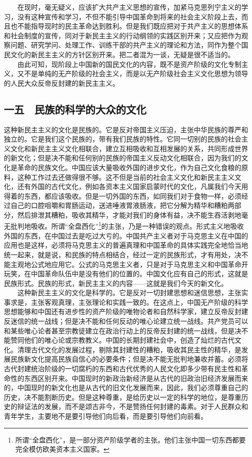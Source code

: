 \documentclass[cn,11pt,chinese]{elegantbook}
\def\myformat#1{\hfil\hfil #1}
\begin{document}
　　在现时，毫无疑义，应该扩大共产主义思想的宣传，加紧马克思列宁主义的学习，没有这种宣传和学习，不但不能引导中国革命到将来的社会主义阶段上去，而且也不能指导现时的民主革命达到胜利。但是我们既应把对于共产主义的思想体系和社会制度的宣传，同对于新民主主义的行动纲领的实践区别开来；又应把作为观察问题、研究学问、处理工作、训练干部的共产主义的理论和方法，同作为整个国民文化的新民主主义的方针区别开来。把二者混为一谈，无疑是很不适当的。\\
　　由此可知，现阶段上中国新的国民文化的内容，既不是资产阶级的文化专制主义，又不是单纯的无产阶级的社会主义，而是以无产阶级社会主义文化思想为领导的人民大众反帝反封建的新民主主义。\\
\subsection*{\myformat{一五　民族的科学的大众的文化}}
这种新民主主义的文化是民族的。它是反对帝国主义压迫，主张中华民族的尊严和独立的。它是我们这个民族的，带有我们民族的特性。它同一切别的民族的社会主义文化和新民主主义文化相联合，建立互相吸收和互相发展的关系，共同形成世界的新文化；但是决不能和任何别的民族的帝国主义反动文化相联合，因为我们的文化是革命的民族文化。中国应该大量吸收外国的进步文化，作为自己文化食粮的原料，这种工作过去还做得很不够。这不但是当前的社会主义文化和新民主主义文化，还有外国的古代文化，例如各资本主义国家启蒙时代的文化，凡属我们今天用得着的东西，都应该吸收。但是一切外国的东西，如同我们对于食物一样，必须经过自己的口腔咀嚼和胃肠运动，送进唾液胃液肠液，把它分解为精华和糟粕两部分，然后排泄其糟粕，吸收其精华，才能对我们的身体有益，决不能生吞活剥地毫无批判地吸收。所谓“全盘西化”\footnote[33]{ 所谓“全盘西化”，是一部分资产阶级学者的主张。他们主张中国一切东西都要完全模仿欧美资本主义国家。}的主张，乃是一种错误的观点。形式主义地吸收外国的东西，在中国过去是吃过大亏的。中国共产主义者对于马克思主义在中国的应用也是这样，必须将马克思主义的普遍真理和中国革命的具体实践完全地恰当地统一起来，就是说，和民族的特点相结合，经过一定的民族形式，才有用处，决不能主观地公式地应用它。公式的马克思主义者，只是对于马克思主义和中国革命开玩笑，在中国革命队伍中是没有他们的位置的。中国文化应有自己的形式，这就是民族形式。民族的形式，新民主主义的内容——这就是我们今天的新文化。\\
　　这种新民主主义的文化是科学的。它是反对一切封建思想和迷信思想，主张实事求是，主张客观真理，主张理论和实践一致的。在这点上，中国无产阶级的科学思想能够和中国还有进步性的资产阶级的唯物论者和自然科学家，建立反帝反封建反迷信的统一战线；但是决不能和任何反动的唯心论建立统一战线。共产党员可以和某些唯心论者甚至宗教徒建立在政治行动上的反帝反封建的统一战线，但是决不能赞同他们的唯心论或宗教教义。中国的长期封建社会中，创造了灿烂的古代文化。清理古代文化的发展过程，剔除其封建性的糟粕，吸收其民主性的精华，是发展民族新文化提高民族自信心的必要条件；但是决不能无批判地兼收并蓄。必须将古代封建统治阶级的一切腐朽的东西和古代优秀的人民文化即多少带有民主性和革命性的东西区别开来。中国现时的新政治新经济是从古代的旧政治旧经济发展而来的，中国现时的新文化也是从古代的旧文化发展而来，因此，我们必须尊重自己的历史，决不能割断历史。但是这种尊重，是给历史以一定的科学的地位，是尊重历史的辩证法的发展，而不是颂古非今，不是赞扬任何封建的毒素。对于人民群众和青年学生，主要地不是要引导他们向后看，而是要引导他们向前看。\\
\end{document}

